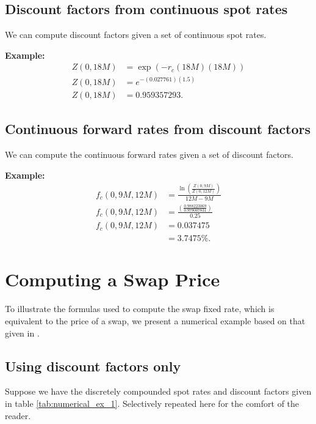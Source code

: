 \subsection{Discount factors from continuous spot rates}

We can compute discount factors given a set of continuous spot rates.

\textbf{Example:}
\begin{align}
    Z(0,18M) &= \exp ( -r_c(18M) (18M) ) \\[6pt]
    Z(0,18M) &= e^{-(0.027761)(1.5)} \\[6pt]
    Z(0,18M) &= 0.959357293.
\end{align}

\subsection{Continuous forward rates from discount factors}

We can compute the continuous forward rates given a set of discount factors.

\textbf{Example:}
\begin{align}
    f_c(0,9M,12M) &= \frac{\ln \left( \frac{Z(0,9M)}{Z(0,12M)} \right)}{12M - 9M} \\[6pt]
    f_c(0,9M,12M) &= \frac{\left( \frac{0.988223069}{0.979007831} \right)}{0.25} \\[6pt]
    f_c(0,9M,12M) &= 0.037475 \\
    &= 3.7475\%.
\end{align}

\section{Computing a Swap Price}
\label{append_A3}
To illustrate the formulas used to compute the swap fixed rate, which is equivalent to the price of a swap, we present a numerical example based on that given in \cite{smith2011bond}.

\subsection{Using discount factors only}

Suppose we have the discretely compounded spot rates and discount factors given in table \ref{tab:numerical_ex_1}. Selectively repeated here for the comfort of the reader.

